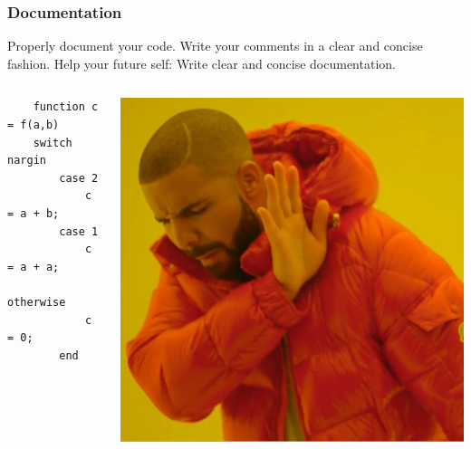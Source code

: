 \begin{frame}[fragile]
  \frametitle{Documentation}
    Properly document your code. Write your comments in a clear and concise fashion. Help your future self: Write clear and concise documentation.
    \begin{columns}
    \begin{lstlisting}
    function c = f(a,b)
    switch nargin
        case 2
            c = a + b;
        case 1
            c = a + a;
        otherwise
            c = 0;
        end
    \end{lstlisting}
    \includegraphics[width=\columnwidth]{figures/drakeno.jpg}
    \end{columns}
\end{frame}

